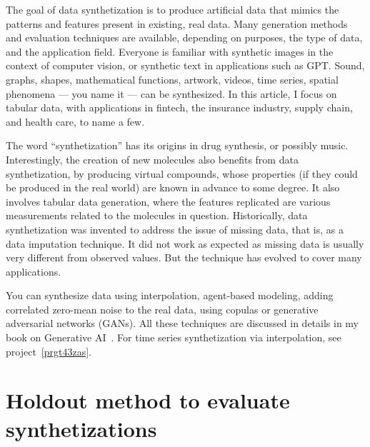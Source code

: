 \documentclass[oneside,10pt]{book}
\begin{document}

The goal of data synthetization is to produce artificial data that mimics the patterns and features present in existing, real data. Many generation methods and evaluation techniques are available, depending on purposes, the type of data, and the application field. Everyone is familiar with synthetic images in the context of computer vision, or synthetic text in applications such as GPT. Sound, graphs, shapes, mathematical functions, artwork, videos, time series, spatial phenomena — you name it — can be synthesized. In this article, I focus on tabular data, with applications in fintech, the insurance industry, supply chain, and health care, to name a few.

The word “synthetization” has its origins in drug synthesis, or possibly music. Interestingly, the creation of new molecules also benefits from data synthetization, by producing virtual compounds, whose properties (if they could be produced in the real world) are known in advance to some degree. It also involves tabular data generation, where the features replicated are various measurements related to the molecules in question. Historically, data synthetization was invented to address the issue of missing data, that is, as a data imputation technique. It did not work as expected as missing data is usually very different from observed values. But the technique has evolved to cover many applications.

You can synthesize data using interpolation, agent-based modeling, adding correlated zero-mean noise to the real data, using copulas or generative adversarial networks (GANs). All these techniques are discussed in details in my book on Generative AI~\cite{vgelsevier}. For time series synthetization via interpolation, see project~\ref{prgt43zas}.


\section{Holdout method to evaluate synthetizations}\label{holfghre3}
\end{document}
